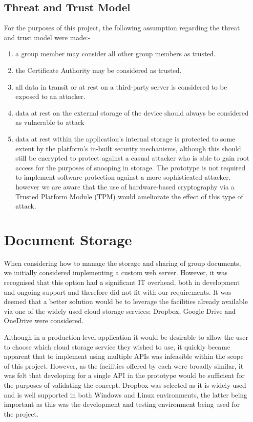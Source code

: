 \subsection*{Threat and Trust Model}
For the purposes of this project, the following assumption regarding the threat and trust model were made:-
\begin{enumerate}[itemsep=3pt]
\item a group member may consider all other group members as trusted.
\item the Certificate Authority may be considered as trusted.  
\item all data in transit or at rest on a third-party server is considered to be exposed to an attacker.
\item data at rest on the external storage of the device should always be considered as vulnerable to attack 
\item  data at rest within the application's internal storage is protected to some extent by the platform's in-built security mechanisms, although this should still be encrypted to protect against a casual attacker who is able to gain root access for the purposes of snooping in storage.  The prototype is not required to implement software protection against a more sophisticated attacker, however we are aware that the use of hardware-based cryptography via a Trusted Platform Module (TPM) would ameliorate the effect of this type of attack.
\end{enumerate} 


\section{Document Storage}
When considering how to manage the storage and sharing of group documents, we initially considered implementing a custom web server.  However, it was recognised that this option had a significant IT overhead, both in development and ongoing support and therefore did not fit with our requirements.  It was deemed that a better solution would be to leverage the facilities already available via one of the widely used cloud storage services:  Dropbox, Google Drive and OneDrive were considered.  

Although in a production-level application it would be desirable to allow the user to choose which cloud storage service they wished to use, it quickly became apparent that to implement using multiple APIs was infeasible within the scope of this project.  However, as the facilities offered by each were broadly similar, it was felt that developing for a single API in the prototype would be sufficient for the purposes of validating the concept.  Dropbox was selected as it is widely used and is well supported in both Windows and Linux environments, the latter being important as this was the development and testing environment being used for the project.  









